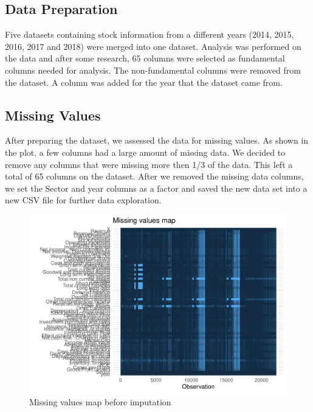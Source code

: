 \documentclass[11pt,]{article}
\begin{document}
\hypertarget{data-preparation}{%
\subsection{Data Preparation}\label{data-preparation}}

Five datasets containing stock information from a different years (2014,
2015, 2016, 2017 and 2018) were merged into one dataset. Analysis was
performed on the data and after some research, 65 columns were selected
as fundamental columns needed for analysis. The non-fundamental columns
were removed from the dataset. A column was added for the year that the
dataset came from.

\hypertarget{missing-values}{%
\subsection{Missing Values}\label{missing-values}}

After preparing the dataset, we assessed the data for missing values. As
shown in the plot, a few columns had a large amount of missing data. We
decided to remove any columns that were missing more then 1/3 of the
data. This left a total of 65 columns on the dataset. After we removed
the missing data columns, we set the Sector and year columns as a factor
and saved the new data set into a new CSV file for further data
exploration.

\begin{figure}

{\centering \includegraphics{stock_analysis_files/figure-latex/missing values-1} 

}

\caption{Missing values map before imputation}\label{fig:missing values}
\end{figure}
\end{document}

